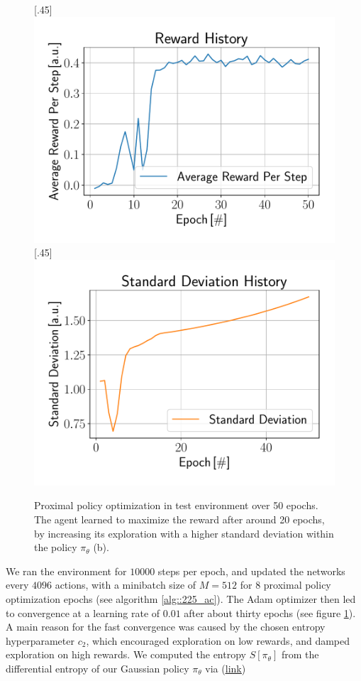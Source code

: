\begin{figure}[h!]
	\centering
	[.45\linewidth]{\includegraphics[scale=.35]{chapters/04_experiments/02_autonomous_walking/ppo_reward_history.pdf}}	
	[.45\linewidth]{\includegraphics[scale=.35]{chapters/04_experiments/02_autonomous_walking/ppo_std_history.pdf}}
	\caption{Proximal policy optimization in test environment over 50 epochs. The agent learned to maximize the reward after around 20 epochs, by increasing its exploration with a higher standard deviation within the policy $\pi_\theta$ (b).}	
	\label{fig::431_ppo_hist}
\end{figure}
We ran the environment for $10000$ steps per epoch, and updated the networks every $4096$ actions, with a minibatch size of $M=512$ for $8$ proximal policy optimization epochs (see algorithm \ref{alg::225_ac}). The Adam optimizer then led to convergence at a learning rate of $0.01$ after about thirty epochs (see figure \ref{fig::431_ppo_hist}). A main reason for the fast convergence was caused by the chosen entropy hyperparameter $c_2$, which encouraged exploration on low rewards, and damped exploration on high rewards. We computed the entropy $S[\pi_\theta]$ from the differential entropy of our Gaussian policy $\pi_\theta$ via (\href{https://github.com/mhubii/ppo_libtorch/blob/481c1e326dcd6220b2c1c955a0303a410c2cb0dd/Models.h#L82}{\underline{link}})
